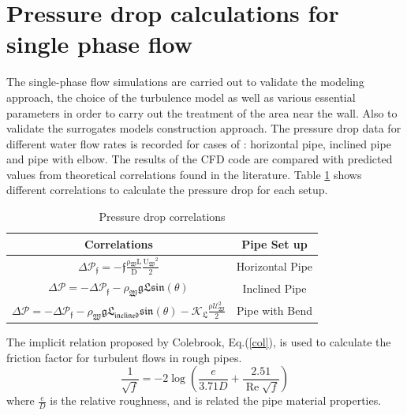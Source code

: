 \documentclass[11pt]{report}
\begin{document}
\section{Pressure drop calculations for single phase flow}\label{single}
%
The single-phase flow simulations are carried out to validate the modeling approach, the choice of the turbulence model as well as various essential parameters in order to carry out the treatment of the area near the wall. 
%
Also to validate the surrogates models construction  approach. 
%
The pressure drop data for different water flow rates is recorded for cases of : horizontal pipe, inclined pipe and pipe with elbow. 
%
The results of the CFD code are compared with predicted values from theoretical correlations found in the literature. 
%
Table \ref{tab:PD} shows different correlations to calculate the pressure drop for each setup.
%
\begin{table}[ht!]
\begin{center}
\caption{Pressure drop correlations}\label{tab:PD}
\begin{tabular}{cc}
\hline Correlations & Pipe Set up  \\
\hline
$ \displaystyle 
\Delta \mathcal{P_\mathfrak{f}=\mathfrak{-f}\frac{\mathrm{\rho\mathfrak{_{W}}} \mathrm{L}}{\mathrm{D}} \frac{\mathrm{U\mathfrak{_{W}}}^\mathrm{{2}}}{\mathrm{2}}}
$ & Horizontal Pipe \\
$ \displaystyle 
\Delta \mathcal{P}=-\Delta \mathcal{P_\mathfrak{f}-\rho_\mathfrak{{W}} \mathfrak{g} \mathfrak{ L} \mathfrak{sin(\theta)}}
$ & Inclined Pipe \\
$ \displaystyle 
\Delta \mathcal{P} =-\Delta \mathcal{ P_\mathfrak{f}-\rho_\mathfrak{{W}} \mathfrak{g} \mathfrak{L}_\mathfrak{{inclined}} \mathfrak{sin(\theta)}- K_\mathfrak{{L}} \frac{\mathrm{\rho} U_\mathfrak{{W}}^\mathrm{{2}}}{\mathrm{2}}}
$ & Pipe with Bend   \\
\hline
\end{tabular}
\end{center}
\end{table}
%
The implicit relation proposed by Colebrook, Eq.(\ref{col}), is used to calculate the friction factor for turbulent flows in rough pipes.
%
\begin{equation}
\frac{1}{\sqrt{f}}=-2 \log \left(\frac{e}{3.71 D}+\frac{2.51}{\operatorname{Re} \sqrt{f}}\right)
\label{col}
\end{equation}
%
where $\frac{e}{D}$ is the relative roughness, and is related the pipe material properties.
\end{document}
